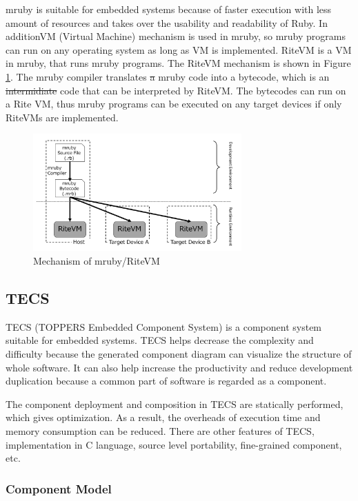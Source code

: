 \documentclass[conference,compsoc]{IEEEtran}
\providecommand{\DIFadd}[1]{{\protect\color{blue}\uwave{#1}}} %
\providecommand{\DIFdel}[1]{{\protect\color{red}\sout{#1}}}                      %
\providecommand{\DIFaddbegin}{} %
\providecommand{\DIFaddend}{} %
\providecommand{\DIFdelbegin}{} %
\providecommand{\DIFdelend}{} %
\begin{document}
mruby is suitable for embedded systems because of faster execution with less amount of resources and takes over the usability and readability of Ruby.
In addition\DIFaddbegin \DIFadd{, }\DIFaddend VM (Virtual Machine) mechanism is used in mruby, so mruby programs can run on any operating system as long as VM is implemented.
RiteVM is a VM in mruby, that runs mruby programs.
The RiteVM mechanism is shown in Figure \ref{fig:mruby}.
The mruby compiler translates \DIFdelbegin \DIFdel{a }\DIFdelend \DIFaddbegin \DIFadd{an }\DIFaddend mruby code into a bytecode, which is an \DIFdelbegin \DIFdel{intermidiate }\DIFdelend \DIFaddbegin \DIFadd{intermediate }\DIFaddend code that can be interpreted by RiteVM.
The bytecodes can run on a Rite VM, \DIFaddbegin \DIFadd{and }\DIFaddend thus mruby programs can be executed on any target devices if only RiteVMs are implemented.
\begin{figure}[t]
    \centering
    \includegraphics[width=8cm,clip]{figure/mruby.pdf}
    \caption{Mechanism of mruby/RiteVM}
    \label{fig:mruby}
\end{figure}

\subsection{TECS}
\label{sec:TECS}
TECS (TOPPERS Embedded Component System) is a component system suitable for embedded systems.
TECS helps decrease the complexity and difficulty because the generated component diagram can visualize the structure of whole software.
It can also help increase the productivity and reduce development duplication  because a common part of software is regarded as a component.

The component deployment and composition in TECS are statically performed, which gives optimization.
As a result, the overheads of execution time and memory consumption can be reduced.
There are other features of TECS, implementation in C language, source level portability, fine-grained component, etc.

\subsubsection{Component Model}\mbox{}\\
\end{document}
